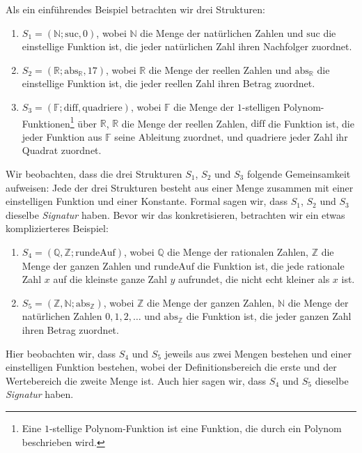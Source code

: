 \documentclass{article}
\begin{document}
Als ein einführendes Beispiel betrachten wir drei Strukturen: 
\begin{enumerate}
 \item $S_1 = (\mathds{N};\mathrm{suc},0)$, wobei $\mathds{N}$ die Menge der 
natürlichen Zahlen und $\mathrm{suc}$ die einstellige Funktion ist, die jeder 
natürlichen Zahl ihren Nachfolger zuordnet. 
 \item $S_2 = (\mathds{R};\mathrm{abs}_{\mathds{R}},17)$, wobei $\mathds{R}$ 
die Menge der reellen Zahlen und $\mathrm{abs}_{\mathds{R}}$ die einstellige 
Funktion ist, die jeder reellen Zahl ihren Betrag zuordnet. 
  \item $S_3 = (\mathds{F}; \mathrm{diff}, \mathrm{quadriere})$, wobei 
$\mathds{F}$ die Menge der $1$-stelligen Polynom-Funktionen\footnote{Eine 
$1$-stellige Polynom-Funktion ist eine Funktion, die durch ein Polynom 
beschrieben wird.} über $\mathds{R}$, $\mathds{R}$ 
die Menge der reellen Zahlen, $\mathrm{diff}$ die Funktion ist, die jeder 
Funktion aus $\mathds{F}$ seine Ableitung zuordnet, und $\mathrm{quadriere}$ 
jeder Zahl ihr Quadrat zuordnet. 
\end{enumerate}
Wir beobachten, dass die drei Strukturen $S_1$, $S_2$ und $S_3$ folgende 
Gemeinsamkeit aufweisen: Jede der drei Strukturen besteht aus einer Menge 
zusammen mit einer einstelligen Funktion und einer Konstante. Formal sagen wir, 
dass $S_1$, $S_2$ und $S_3$ dieselbe \emph{Signatur} haben. Bevor wir das 
konkretisieren, 
betrachten wir 
ein etwas komplizierteres Beispiel: 
\begin{enumerate}
 \item $S_4 = (\mathds{Q},\mathds{Z};\mathrm{rundeAuf})$, wobei $\mathds{Q}$ 
die Menge der rationalen Zahlen, $\mathds{Z}$ die Menge der ganzen Zahlen und 
$\mathrm{rundeAuf}$ die Funktion ist, die jede rationale Zahl $x$ auf die 
kleinste ganze Zahl $y$ aufrundet, die nicht echt kleiner als $x$ ist. 
 \item $S_5 = (\mathds{Z},\mathds{N};\mathrm{abs}_{\mathds{Z}})$, wobei 
$\mathds{Z}$ die Menge der ganzen Zahlen, $\mathds{N}$ die Menge der 
natürlichen Zahlen $0,1,2,\ldots$ und $\mathrm{abs}_{\mathds{Z}}$ die Funktion 
ist, die jeder ganzen Zahl ihren Betrag zuordnet. 
\end{enumerate}
Hier beobachten wir, dass $S_4$ und $S_5$ jeweils aus zwei Mengen bestehen und 
einer einstelligen Funktion bestehen, wobei der Definitionsbereich die erste 
und der Wertebereich die zweite Menge ist. Auch hier sagen wir, dass $S_4$ und 
$S_5$ dieselbe \emph{Signatur} haben. 
\end{document}
